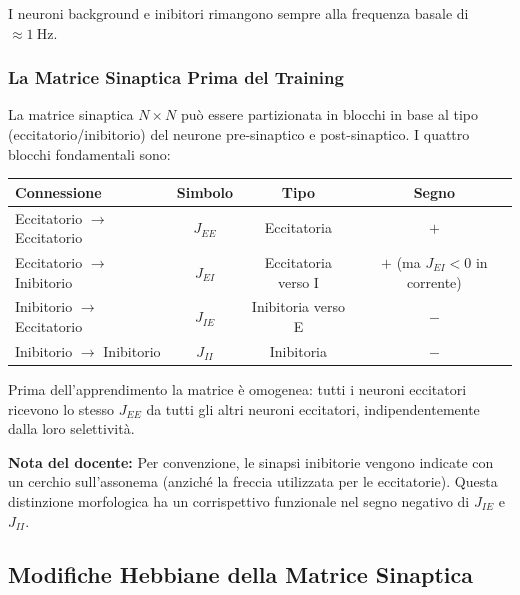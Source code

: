 I neuroni background e inibitori rimangono sempre alla frequenza basale di $\approx 1\ \mathrm{Hz}$.

\subsubsection{La Matrice Sinaptica Prima del Training}

La matrice sinaptica $N \times N$ può essere partizionata in blocchi in base al tipo (eccitatorio/inibitorio) del neurone pre-sinaptico e post-sinaptico. I quattro blocchi fondamentali sono:

\begin{table}[htbp]
    \centering
    \renewcommand{\arraystretch}{1.3}
    \begin{tabularx}{\textwidth}{|X|c|c|c|}
    \hline
    \textbf{Connessione} & \textbf{Simbolo} & \textbf{Tipo} & \textbf{Segno} \\
    \hline
    Eccitatorio $\rightarrow$ Eccitatorio & $J_{EE}$ & Eccitatoria & $+$ \\
    \hline
    Eccitatorio $\rightarrow$ Inibitorio & $J_{EI}$ & Eccitatoria verso I & $+$ (ma $J_{EI} < 0$ in corrente) \\
    \hline
    Inibitorio $\rightarrow$ Eccitatorio & $J_{IE}$ & Inibitoria verso E & $-$ \\
    \hline
    Inibitorio $\rightarrow$ Inibitorio & $J_{II}$ & Inibitoria & $-$ \\
    \hline
    \end{tabularx}
\end{table}


Prima dell'apprendimento la matrice è omogenea: tutti i neuroni eccitatori ricevono lo stesso $J_{EE}$ da tutti gli altri neuroni eccitatori, indipendentemente dalla loro selettività.

\begin{tcolorbox}[colback=gray!5, colframe=gray!40, arc=2mm, boxrule=0.5pt]
\textbf{Nota del docente:} Per convenzione, le sinapsi inibitorie vengono indicate con un cerchio sull'assonema (anziché la freccia utilizzata per le eccitatorie). Questa distinzione morfologica ha un corrispettivo funzionale nel segno negativo di $J_{IE}$ e $J_{II}$.
\end{tcolorbox}


\subsection{Modifiche Hebbiane della Matrice Sinaptica}

